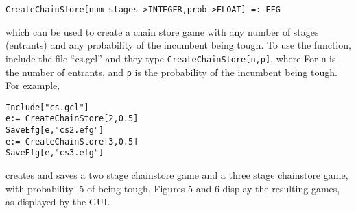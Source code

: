 \begin{verbatim}
CreateChainStore[num_stages->INTEGER,prob->FLOAT] =: EFG
\end{verbatim}

\noindent
which can be used to create a chain store game with any number of
stages (entrants) and any probability of the incumbent being tough.
To use the function, include the file ``cs.gcl'' and they type
\verb+CreateChainStore[n,p]+, where For \verb+n+ is the number of
entrants, and \verb+p+ is the probability of the incumbent being
tough. For example, 

\begin{verbatim}
Include["cs.gcl"]
e:= CreateChainStore[2,0.5]
SaveEfg[e,"cs2.efg"]
e:= CreateChainStore[3,0.5]
SaveEfg[e,"cs3.efg"]
\end{verbatim}

\noindent
creates and saves a two stage chainstore game and a three stage
chainstore game, with probability .5 of being tough. Figures 5 and 6
display the resulting games, as displayed by the GUI. 

